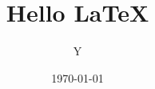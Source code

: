 \documentclass[UTF8,a4paper,zihao=-4]{jnuart}%
\author{Y}
\title{Hello \LaTeX}
\date{\today}
\begin{document}
    \maketitle                                                  %
    \makehome
    \makedeclaretion
    \layout
    \clearpage

    \tableofcontents                                    %


    
    
    


    


    
    
\end{document}
